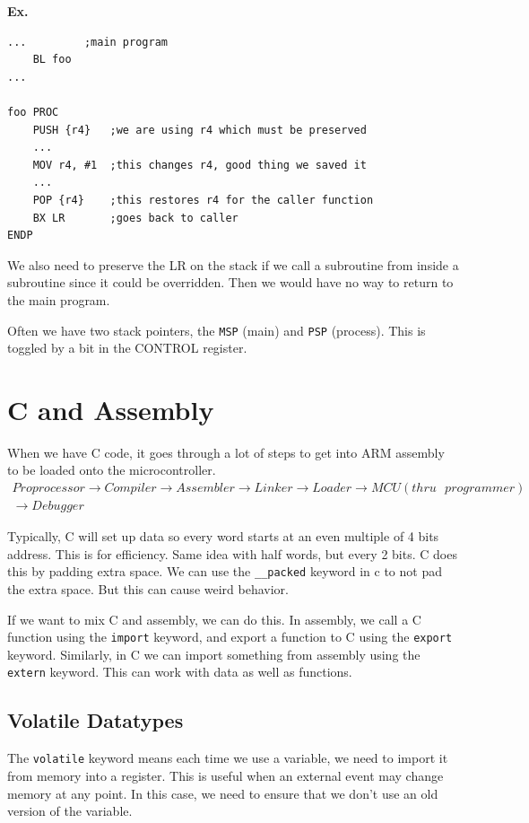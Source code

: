\documentclass[12pt,letterpaper]{article} \usepackage{amsmath} \usepackage{graphicx} \usepackage[margin=1in]{geometry} \usepackage{longtable}  \usepackage{amssymb}
\begin{document}
	\begin{mdframed}
		\textbf{Ex.}
		\begin{lstlisting}
...			;main program
	BL foo
...

foo PROC
	PUSH {r4}	;we are using r4 which must be preserved
	...
	MOV r4, #1	;this changes r4, good thing we saved it
	...
	POP {r4}	;this restores r4 for the caller function
	BX LR		;goes back to caller
ENDP
		\end{lstlisting}
	\end{mdframed}
	
	We also need to preserve the LR on the stack if we call a subroutine from inside a subroutine since it could be overridden. Then we would have no way to return to the main program.
	
	Often we have two stack pointers, the \verb*|MSP| (main) and \verb*|PSP| (process). This is toggled by a bit in the CONTROL register. 
	
	\section{C and Assembly}
	When we have C code, it goes through a lot of steps to get into ARM assembly to be loaded onto the microcontroller.
	\begin{align*}
		Proprocessor \to Compiler \to Assembler \to Linker \to Loader \to MCU (thru \text{ }programmer)\\\to Debugger
	\end{align*}
	
	Typically, C will set up data so every word starts at an even multiple of 4 bits address. This is for efficiency. Same idea with half words, but every 2 bits. C does this by padding extra space. We can use the \verb*|__packed| keyword in c to not pad the extra space. But this can cause weird behavior. 
	
	If we want to mix C and assembly, we can do this. In assembly, we call a C function using the \verb*|import| keyword, and export a function to C using the \verb*|export| keyword. Similarly, in C we can import something from assembly using the \verb*|extern| keyword. This can work with data as well as functions. 
	
	\subsection{Volatile Datatypes}
	The \verb|volatile| keyword means each time we use a variable, we need to import it from memory into a register. This is useful when an external event may change memory at any point. In this case, we need to ensure that we don't use an old version of the variable.
	
\end{document}
